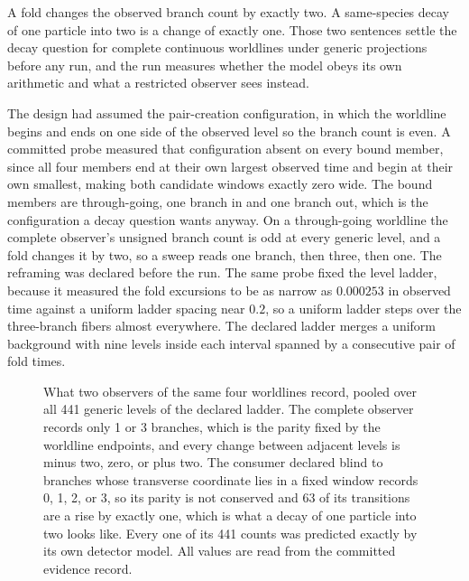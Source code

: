 \documentclass[aps,pre,reprint,nofootinbib,floatfix]{revtex4-2}
\begin{document}
A fold changes the observed branch count by exactly two.  A
same-species decay of one particle into two is a change of exactly one.
Those two sentences settle the decay question for complete continuous
worldlines under generic projections before any run, and the run
measures whether the model obeys its own arithmetic and what a
restricted observer sees instead.

The design had assumed the pair-creation configuration, in which the
worldline begins and ends on one side of the observed level so the
branch count is even.  A committed probe measured that configuration
absent on every bound member, since all four members end at their own
largest observed time and begin at their own smallest, making both
candidate windows exactly zero wide.  The bound members are
through-going, one branch in and one branch out, which is the
configuration a decay question wants anyway.  On a through-going
worldline the complete observer's unsigned branch count is odd at every
generic level, and a fold changes it by two, so a sweep reads one
branch, then three, then one.  The reframing was declared before the
run.  The same probe fixed the level ladder, because it measured the
fold excursions to be as narrow as $0.000253$ in observed time against
a uniform ladder spacing near $0.2$, so a uniform ladder steps over the
three-branch fibers almost everywhere.  The declared ladder merges a
uniform background with nine levels inside each interval spanned by a
consecutive pair of fold times.

\begin{figure}[t]
\centering
{}
\caption{What two observers of the same four worldlines record, pooled
over all 441 generic levels of the declared ladder.  The complete
observer records only 1 or 3 branches, which is the parity fixed by the
worldline endpoints, and every change between adjacent levels is minus
two, zero, or plus two.  The consumer declared blind to branches whose
transverse coordinate lies in a fixed window records 0, 1, 2, or 3, so
its parity is not conserved and 63 of its transitions are a rise by
exactly one, which is what a decay of one particle into two looks like.
Every one of its 441 counts was predicted exactly by its own detector
model.  All values are read from the committed evidence record.}
\label{fig:pf8}
\end{figure}
\end{document}
